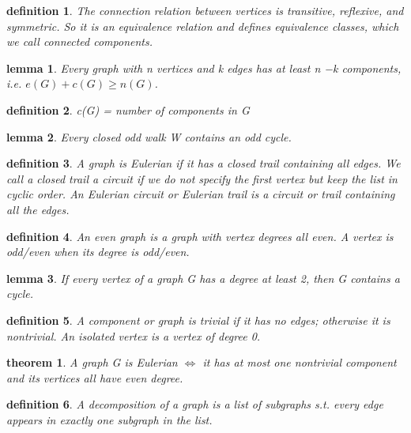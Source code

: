 \documentclass[twocolumn][2pt]{article}
\newtheorem{theorem}{theorem}[section]  %
\newtheorem{definition}{definition}
\newtheorem{lemma}{lemma}
\begin{document}
\begin{CJK*}{UTF8}{bkai}
    \begin{definition}
        The connection relation between vertices is transitive, reflexive, and
 symmetric. So it is an equivalence relation and defines equivalence classes,
 which we call connected components.
    \end{definition}

    \begin{lemma}
         Every graph with n vertices and k edges has at least n −k components, i.e.
 $e(G) +c(G) \geq n(G)$.
    \end{lemma}

    \begin{definition}
         c(G) = number of components in G
    \end{definition}

    \begin{lemma}
         Every closed odd walk W contains an odd cycle.
    \end{lemma}

    \begin{definition}
        A graph is Eulerian if it has a closed trail containing all edges. We call a
 closed trail a circuit if we do not specify the first vertex but keep the list in
 cyclic order. An Eulerian circuit or Eulerian trail is a circuit or trail
 containing all the edges.
    \end{definition}

    \begin{definition}
        An even graph is a graph with vertex degrees all even. A vertex is odd/even
 when its degree is odd/even.
    \end{definition}

    \begin{lemma}
        If every vertex of a graph G has a degree at least 2, then G contains a cycle.
    \end{lemma}

    \begin{definition}
         A component or graph is trivial if it has no edges; otherwise it is nontrivial.
 An isolated vertex is a vertex of degree 0.
    \end{definition}

    \begin{theorem}
        A graph G is Eulerian $\iff$ it has at most one nontrivial component and its
 vertices all have even degree.
    \end{theorem}
    
    \begin{definition}
        A decomposition of a graph is a list of subgraphs s.t. every edge appears in
 exactly one subgraph in the list.
    \end{definition}


\end{CJK*}
\end{document}
